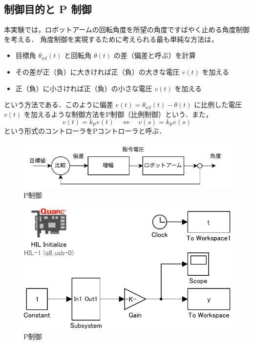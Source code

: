 \subsection{制御目的と P 制御}

本実験では，ロボットアームの回転角度を所望の角度ですばやく止める角度制御を考える．
角度制御を実現するために考えられる最も単純な方法は，
\begin{itemize}
  \item 目標角 \( \theta_{\text{ref}}(t) \) と回転角 \( \theta(t) \) の差（偏差と呼ぶ）を計算
  \item その差が正（負）に大きければ正（負）の大きな電圧 \(v(t)\) を加える
  \item 正（負）に小さければ正（負）の小さな電圧 \(v(t)\) を加える
\end{itemize}
という方法である．このように偏差 \(e(t) = \theta_{\text{ref}}(t) - \theta(t)\) 
に比例した電圧 \(v(t)\) を加えるような制御方法をP制御（比例制御）という．また，
\begin{equation}
  v(t) = k_{\mathrm{P}} e(t) \quad \Longleftrightarrow \quad v(s) = k_{\mathrm{P}} e(s)
\end{equation}
という形式のコントローラをPコントローラと呼ぶ．


\begin{figure}[h]
  \centering
  \includegraphics[scale=1]{sozai/3.pdf}
  \caption{P制御}
\end{figure}

\begin{figure}[h]
  \centering
  \includegraphics[scale=1]{sozai/group03/ad_da/ad_da_conv-crop.pdf}
  \caption{P制御}
\end{figure}

